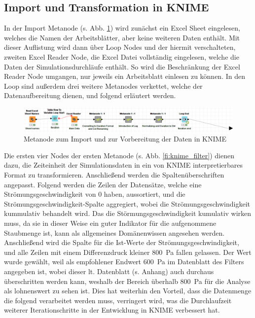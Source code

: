     \subsection{Import und Transformation in KNIME}
    In der Import Metanode (s. Abb. \ref{fi:knime_import}) wird zunächst ein Excel Sheet eingelesen, welches die Namen der Arbeitsblätter, aber keine weiteren Daten enthält. Mit dieser Auflistung wird dann über Loop Nodes und der hiermit verschalteten, zweiten Excel Reader Node, die Excel Datei vollständig eingelesen, welche die Daten der Simulationsdurchläufe enthält. So wird die Beschränkung der Excel Reader Node umgangen, nur jeweils ein Arbeitsblatt einlesen zu können.
    In den Loop sind außerdem drei weitere Metanodes verkettet, welche der Datenaufbereitung dienen, und folgend erläutert werden.
    \begin{figure}[H]
        \begin{center}
            \includegraphics[width=\linewidth]{images/knime_import.png}
            \caption[KNIME Import Metanode]{Metanode zum Import und zur Vorbereitung der Daten in KNIME}
            \label{fi:knime_import}
        \end{center}
    \end{figure}
    Die ersten vier Nodes der ersten Metanode (s. Abb. \ref{fi:knime_filter}) dienen dazu, die Zeiteinheit der Simulationsdaten in ein von KNIME interpretierbares Format zu transformieren. 
    Anschließend werden die Spaltenüberschriften angepasst. Folgend werden die Zeilen der Datensätze, welche eine Strömungsgeschwindigkeit von 0 haben, aussortiert, und die Strömungsgeschwindigkeit-Spalte aggregiert, wobei die Strömungsgeschwindigkeit kummulativ behandelt wird. Das die Störmungsgeschwindigkeit kumulativ wirken muss, da sie in dieser Weise ein guter Indikator für die aufgenommene Staubmenge ist, kann als allgemeines Domänenwissen angesehen werden. Anschließend wird die Spalte für die Ist-Werte der Strömungsgeschwindigkeit, und alle Zeilen mit einem Differenzdruck kleiner \SI{800}{\pascal} fallen gelassen. 
    Der Wert wurde gewählt, weil als empfohlener Endwert \SI{600}{\pascal} im Datenblatt des Filters angegeben ist, wobei dieser lt. Datenblatt (s. Anhang) auch durchaus überschritten werden kann, weshalb der Bereich überhalb \SI{800}{\pascal} für die Analyse als lohnenswert zu sehen ist. Dies hat weiterhin den Vorteil, dass die Datenmenge die folgend verarbeitet werden muss, verringert wird, was die Durchlaufzeit weiterer Iterationschritte in der Entwicklung in KNIME verbessert hat.
